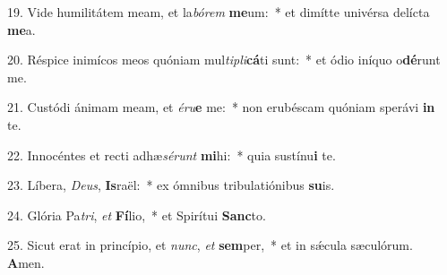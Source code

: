 19. Vide humilitátem meam, et la\textit{bó}\textit{rem} \textbf{me}um:~*  et dimítte univérsa delícta \textbf{me}a.\

20. Réspice inimícos meos quóniam mul\textit{ti}\textit{pli}\textbf{cá}ti sunt:~*  et ódio iníquo o\textbf{dé}runt me.\

21. Custódi ánimam meam, et \textit{é}\textit{ru}\textbf{e} me:~*  non erubéscam quóniam sperávi \textbf{in} te.\

22. Innocéntes et recti adhæ\textit{sé}\textit{runt} \textbf{mi}hi:~*  quia sustínu\textbf{i} te.\

23. Líbera, \textit{De}\textit{us}, \textbf{Is}raël:~*  ex ómnibus tribulatiónibus \textbf{su}is.\

24. Glória Pa\textit{tri}, \textit{et} \textbf{Fí}lio,~*  et Spirítui \textbf{Sanc}to.\

25. Sicut erat in princípio, et \textit{nunc}, \textit{et} \textbf{sem}per,~*  et in sǽcula sæculórum. \textbf{A}men.\

